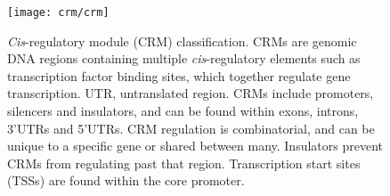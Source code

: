 \begin{figure}[!ht]
\begin{center}
\capstart
\texttt{[image: crm/crm]}
\caption{\textit{Cis}\hyp{}regulatory module (CRM) classification. CRMs are genomic DNA
regions containing multiple \textit{cis}\hyp{}regulatory elements such as
transcription factor binding sites, which together regulate gene
transcription. UTR, untranslated region. CRMs include promoters,
silencers and insulators, and can be found within exons, introns, 3'UTRs
and 5'UTRs. CRM regulation is combinatorial, and can be unique to a
specific gene or shared between many. Insulators prevent CRMs from
regulating past that region. Transcription start sites (TSSs) are found
within the core promoter.
\label{fig:crm}
}
\end{center}
\end{figure}


